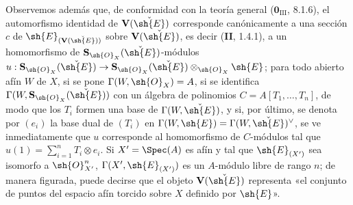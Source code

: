 
Observemos además que, de conformidad con la teoría general ($\mathbf{0}_{\mathrm{III}}$, 8.1.6), el automorfismo identidad de $\mathbf V(\check{\sh{E}})$ corresponde canónicamente a una sección $c$ de $\sh{E}_{(\mathbf V(\check{\sh{E}}))}$ sobre $\mathbf V(\check{\sh{E}})$, es decir (\textbf{II}, 1.4.1), a un homomorfismo de $\mathbf S_{\sh{O}_X}(\check{\sh{E}})$-módulos
$u:\mathbf S_{\sh{O}_X}(\check{\sh{E}})\to\mathbf S_{\sh{O}_X}(\check{\sh{E}})\otimes_{\sh{O}_X}\sh{E}$;
para todo abierto afín $W$ de $X$, si se pone $\Gamma(W,\sh{O}_X)=A$, si se identifica $\Gamma(W,\mathbf S_{\sh{O}_X}(\check{\sh{E}}))$ con un álgebra de polinomios $C=A[T_1,\ldots,T_n]$, de modo que los $T_i$ formen una base de $\Gamma(W,\check{\sh{E}})$, y si, por último, se denota por $(e_i)$ la base dual de $(T_i)$ en $\Gamma(W,\sh{E})=\Gamma(W,\check{\sh{E}})^\vee$, se ve inmediatamente que $u$ corresponde al homomorfismo de $C$-módulos tal que
$u(1)=\sum_{i=1}^n T_i\otimes e_i$.
Si $X'=\Spec(A)$ es afín y tal que $\sh{E}_{(X')}$ sea isomorfo a $\sh{O}_{X'}^n$, $\Gamma(X',\sh{E}_{(X')})$ es un $A$-módulo libre de rango $n$; de manera figurada, puede decirse que el objeto $\mathbf V(\check{\sh{E}})$ representa «el conjunto de puntos del espacio afín torcido sobre $X$ definido por $\sh{E}$».

